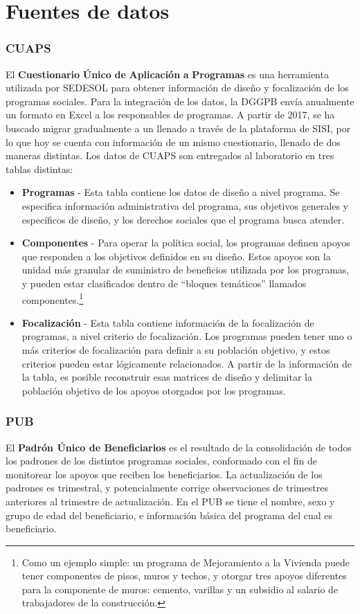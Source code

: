 \chapter{Fuentes de datos}

\subsection*{CUAPS}
El \textbf{Cuestionario} \textbf{Único} \textbf{de} \textbf{Aplicación} \textbf{a} \textbf{Programas} es una herramienta utilizada por SEDESOL para obtener información de diseño y focalización de  los programas sociales. Para la integración de los datos, la DGGPB envía anualmente un formato en Excel a los responsables de programas. A partir de 2017, se ha buscado migrar gradualmente a un llenado a través de la plataforma de SISI, por lo que hoy se cuenta con información de un mismo cuestionario, llenado de dos maneras distintas. Los datos de CUAPS son entregados al laboratorio en tres tablas distintas:
\begin{itemize}
    \item \textbf{Programas} - Esta tabla contiene los datos de diseño a nivel programa. Se especifica información administrativa del programa, sus objetivos generales y específicos de diseño, y los derechos sociales que el programa busca atender.
    \item \textbf{Componentes} - Para operar la política social, los programas definen apoyos que responden a los objetivos definidos en su diseño. Estos apoyos son la unidad más granular de suministro de beneficios utilizada por los programas, y pueden estar clasificados dentro de “bloques temáticos” llamados componentes.\footnote{Como un ejemplo simple: un programa de Mejoramiento a la Vivienda puede tener componentes de pisos, muros y techos, y otorgar tres apoyos diferentes para la componente de muros: cemento, varillas y un subsidio al salario de trabajadores de la construcción.}
    \item \textbf{Focalización} - Esta tabla contiene información de la focalización de programas, a nivel criterio de focalización. Los programas pueden tener uno o más criterios de focalización para definir a su población objetivo, y estos criterios pueden estar lógicamente relacionados. A partir de la información de la tabla, es posible reconstruir esas matrices de diseño y delimitar la población objetivo de los apoyos otorgados por los programas.
\end{itemize}
\subsection*{PUB}
El \textbf{Padrón Único de Beneficiarios} es el resultado de la consolidación de todos los padrones de los distintos programas sociales, conformado con el fin de monitorear los apoyos que reciben los beneficiarios. La actualización de los padrones es trimestral, y potencialmente corrige observaciones de trimestres anteriores al trimestre de actualización. En el PUB se tiene el nombre, sexo y grupo de edad del beneficiario, e información básica del programa del cual es beneficiario.
